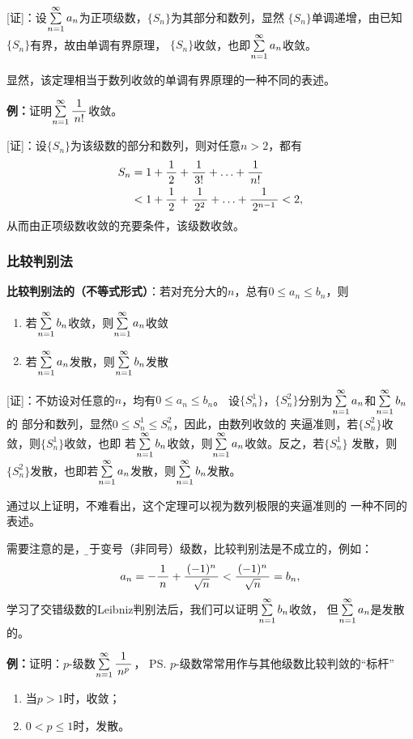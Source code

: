[证]：设$\sumn a_n$为正项级数，$\{S_n\}$为其部分和数列，显然
$\{S_n\}$单调递增，由已知$\{S_n\}$有界，故由单调有界原理，
$\{S_n\}$收敛，也即$\sumn a_n$收敛。\fin

显然，该定理相当于数列收敛的单调有界原理的一种不同的表述。

{\bf 例：}证明$\sumn\df1{n!}$收敛。

[证]：设$\{S_n\}$为该级数的部分和数列，则对任意$n>2$，都有
\begin{align*}
	S_n&=1+\df12+\df1{3!}+\ldots+\df1{n!}\\
	&<1+\df12+\df1{2^2}+\ldots+\df1{2^{n-1}}<2,
\end{align*}
从而由正项级数收敛的充要条件，该级数收敛。\fin

\subsubsection{比较判别法}

\begin{thx}
	{\bf 比较判别法的（不等式形式）}：若对充分大的$n$，总有$0\leq a_n\leq b_n$，则
	\begin{enumerate}
	  \item 若$\sumn b_n$收敛，则$\sumn a_n$收敛
	  \item 若$\sumn a_n$发散，则$\sumn b_n$发散
	\end{enumerate}
\end{thx}

[证]：不妨设对任意的$n$，均有$0\leq a_n\leq b_n$。
设$\{S_n^1\}$，$\{S_n^2\}$分别为$\sumn a_n$和$\sumn b_n$的
部分和数列，显然$0\leq S_n^1\leq S_n^2$，因此，由数列收敛的
夹逼准则，若$\{S_n^2\}$收敛，则$\{S_n^1\}$收敛，也即
若$\sumn b_n$收敛，则$\sumn a_n$收敛。反之，若$\{S_n^1\}$
发散，则$\{S_n^2\}$发散，也即若$\sumn a_n$发散，则$\sumn b_n$发散。\fin

通过以上证明，不难看出，这个定理可以视为数列极限的夹逼准则的
一种不同的表述。

需要注意的是，{\b 对于变号（非同号）级数，比较判别法是不成立的}，例如：
$$a_n=-\df1n+\df{(-1)^n}{\sqrt n}<\df{(-1)^n}{\sqrt n}=b_n,$$
学习了交错级数的Leibniz判别法后，我们可以证明$\sumn b_n$收敛，
但$\sumn a_n$是发散的。

{\bf 例：}证明：$p$-级数$\sumn\df1{n^p}$，
\ps{$p$-级数常常用作与其他级数比较判敛的“标杆”}
\begin{enumerate}[(1)]
  \setlength{\itemindent}{1cm}
  \item 当$p>1$时，收敛；
  \item $0<p\leq 1$时，发散。
\end{enumerate}

